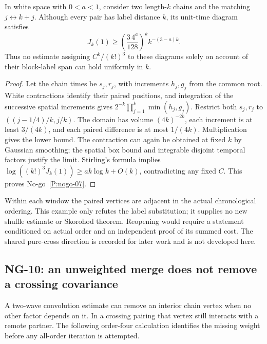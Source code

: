 \setcounter{nogo}{6}
\begin{nogo}
  \label{P:nogo-07}
  In white space with $0<a<1$, consider two length-$k$ chains and the matching
  $j\leftrightarrow k+j$. Although every pair has label distance $k$, its
  unit-time diagram satisfies
  \[
    J_k(1)\ge \left(\frac{3\,4^a}{128}\right)^k k^{-(3-a)k}.
  \]
  Thus no estimate assigning $C^k/(k!)^3$ to these diagrams solely on account
  of their block-label span can hold uniformly in $k$.
\end{nogo}
\begin{proof}
  Let the chain times be $s_j,r_j$, with increments $h_j,g_j$ from the
  common root. White contractions identify their paired positions, and
  integration of the successive spatial increments gives
  $2^{-k}\prod_{j=1}^k\min(h_j,g_j)$. Restrict both $s_j,r_j$ to
  $((j-1/4)/k,j/k)$. The domain has volume $(4k)^{-2k}$,
  each increment is at least $3/(4k)$, and each paired difference is at most
  $1/(4k)$. Multiplication gives the lower bound. The contraction can again
  be obtained at fixed $k$ by Gaussian smoothing; the spatial box bound and
  integrable disjoint temporal factors justify the limit.
  Stirling's formula implies
  $\log((k!)^3J_k(1))\ge a k\log k+O(k)$, contradicting any fixed $C$.
  This proves No-go~\ref{P:nogo-07}.
\end{proof}

Within each window the paired vertices are adjacent in the actual
chronological ordering. This example only refutes the label substitution;
it supplies no new shuffle estimate or Skorohod theorem. Reopening would
require a statement conditioned on actual order and an independent proof
of its summed cost. The shared pure-cross direction is recorded for later work and is not
developed here.

\subsection[NG-10: crossing covariance survives merging]{NG-10: an unweighted merge does not remove a crossing covariance}
\label{S:nogo-10}

A two-wave convolution estimate can remove an interior chain vertex when
no other factor depends on it. In a crossing pairing that vertex still
interacts with a remote partner. The following order-four calculation
identifies the missing weight before any all-order iteration is attempted.

